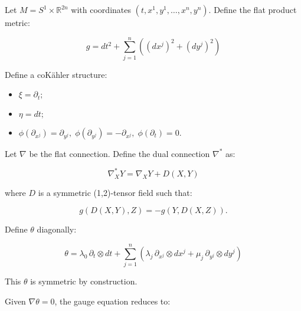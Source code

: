 Let $M = S^1 \times \mathbb{R}^{2n}$ with coordinates $(t, x^1, y^1, \dots, x^n, y^n)$. Define the flat product metric:

$$
g = dt^2 + \sum_{j=1}^n \left( (dx^j)^2 + (dy^j)^2 \right)
$$

Define a coK\"{a}hler structure:
\begin{itemize}
\item $\xi = \partial_t;$
\item $\eta = dt;$
\item $\phi(\partial_{x^j}) = \partial_{y^j}, \; \phi(\partial_{y^j}) = -\partial_{x^j}, \; \phi(\partial_t) = 0.$
\end{itemize}


Let $\nabla$ be the flat connection. Define the dual connection $\nabla^*$ as:

$$
\nabla^*_X Y = \nabla_X Y + D(X, Y)
$$

where $D$ is a symmetric (1,2)-tensor field such that:

$$
g(D(X,Y),Z) = -g(Y,D(X,Z)).
$$


Define $\theta$ diagonally:

$$
\theta = \lambda_0 \, \partial_t \otimes dt + \sum_{j=1}^n \left( \lambda_j \, \partial_{x^j} \otimes dx^j + \mu_j \, \partial_{y^j} \otimes dy^j \right)
$$

This $\theta$ is symmetric by construction.


Given $\nabla \theta = 0$, the gauge equation reduces to:

